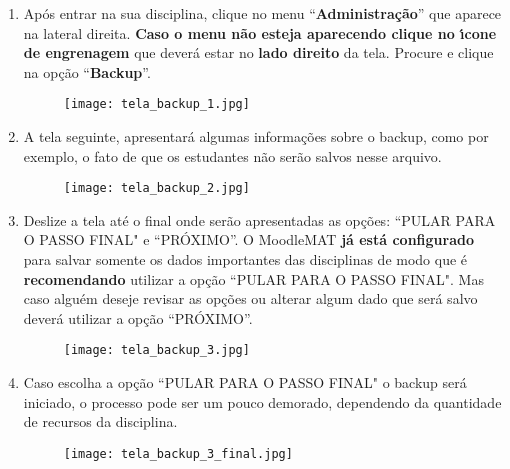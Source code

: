 \documentclass[12pt]{report}
\begin{document}
\begin{enumerate}[\bf 1)]
	\item Ap\'os entrar na sua disciplina, clique no menu ``\textbf{Administra\c{c}\~ao}'' que aparece na lateral direita. \textbf{Caso o menu n\~ao esteja aparecendo clique no {\'\i}cone de engrenagem} que dever\'a estar no \textbf{lado direito} da tela. Procure e clique na op\c{c}\~ao ``\textbf{Backup}''.
	\begin{figure}[H]
    	\centering
    	\hspace*{-2.5cm}\texttt{[image: tela\_backup\_1.jpg]}
  	\end{figure}
	
	\newpage

	\item A tela seguinte, apresentar\'a algumas informa\c{c}\~oes sobre o backup, como por exemplo, o fato de que os estudantes n\~ao ser\~ao salvos nesse arquivo.
	\begin{figure}[H]
    	\centering
    	\hspace*{-2.5cm}\texttt{[image: tela\_backup\_2.jpg]}
  	\end{figure}

  	\newpage

	\item Deslize a tela at\'e o final onde ser\~ao apresentadas as op\c{c}\~oes: ``PULAR PARA O PASSO FINAL" e ``PR\'OXIMO''. O MoodleMAT \textbf{j\'a est\'a configurado} para salvar somente os dados importantes das disciplinas de modo que \'e \textbf{recomendando} utilizar a op\c{c}\~ao ``PULAR PARA O PASSO FINAL". Mas caso algu\'em deseje revisar as op\c{c}\~oes ou alterar algum dado que ser\'a salvo dever\'a utilizar a op\c{c}\~ao ``PR\'OXIMO''.
	\begin{figure}[H]
    	\centering
    	\hspace*{-2.5cm}\texttt{[image: tela\_backup\_3.jpg]}
  	\end{figure}

  	\newpage

	\item Caso escolha a op\c{c}\~ao ``PULAR PARA O PASSO FINAL" o backup ser\'a iniciado, o processo pode ser um pouco demorado, dependendo da quantidade de recursos da disciplina.
	\begin{figure}[H]
    	\centering
    	\hspace*{-2.5cm}\texttt{[image: tela\_backup\_3\_final.jpg]}
  	\end{figure}


\end{enumerate}
\end{document}

